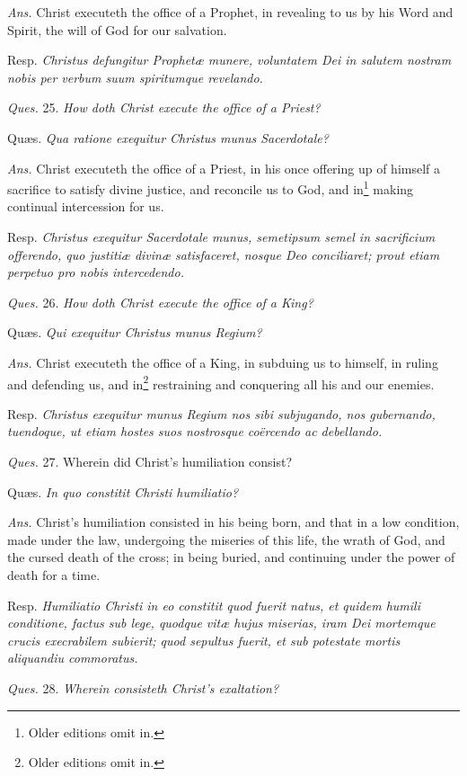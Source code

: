 \emph{Ans.} Christ executeth the office of a Prophet, in revealing to us by his Word and Spirit, the will of God for our salvation.

Resp. \emph{Christus defungitur Prophetæ munere, voluntatem Dei in salutem nostram nobis per verbum suum spiritumque revelando.}

\emph{Ques.} 25. \emph{How doth Christ execute the office of a Priest?}

Quæs. \emph{Qua ratione exequitur Christus munus Sacerdotale?}

\emph{Ans.} Christ executeth the office of a Priest, in his once offering up of himself a sacrifice to satisfy divine justice, and reconcile us to God, and in\footnote{Older editions omit in.} making continual intercession for us.

Resp. \emph{Christus exequitur Sacerdotale munus, semetipsum semel in sacrificium offerendo, quo justitiæ divinæ satisfaceret, nosque Deo conciliaret; prout etiam perpetuo pro nobis intercedendo.}

\emph{Ques.} 26. \emph{How doth Christ execute the office of a King?}

Quæs. \emph{Qui exequitur Christus munus Regium?}

\emph{Ans.} Christ executeth the office of a King, in subduing us to himself, in ruling and defending us, and in\footnote{Older editions omit in.} restraining and conquering all his and our enemies.

Resp. \emph{Christus exequitur munus Regium nos sibi subjugando, nos gubernando, tuendoque, ut etiam hostes suos nostrosque coërcendo ac debellando.}

\emph{Ques.} 27. Wherein did Christ's humiliation consist?

Quæs. \emph{In quo constitit Christi humiliatio?}

\emph{Ans.} Christ's humiliation consisted in his being born, and that in a low condition, made under the law, undergoing the miseries of this life, the wrath of God, and the cursed death of the cross; in being buried, and continuing under the power of death for a time.

Resp. \emph{Humiliatio Christi in eo constitit quod fuerit natus, et quidem humili conditione, factus sub lege, quodque vitæ hujus miserias, iram Dei mortemque crucis execrabilem subierit; quod sepultus fuerit, et sub potestate mortis aliquandiu commoratus.}

\emph{Ques.} 28. \emph{Wherein consisteth Christ's exaltation?}

